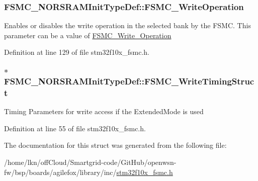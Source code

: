 \subsubsection[{\texorpdfstring{F\+S\+M\+C\+\_\+\+Write\+Operation}{FSMC_WriteOperation}}]{ F\+S\+M\+C\+\_\+\+N\+O\+R\+S\+R\+A\+M\+Init\+Type\+Def\+::\+F\+S\+M\+C\+\_\+\+Write\+Operation}\hypertarget{struct_f_s_m_c___n_o_r_s_r_a_m_init_type_def_a596793d1735c4e38c87e3bf91d986370}{}\label{struct_f_s_m_c___n_o_r_s_r_a_m_init_type_def_a596793d1735c4e38c87e3bf91d986370}
Enables or disables the write operation in the selected bank by the F\+S\+MC. This parameter can be a value of \hyperlink{group___f_s_m_c___write___operation}{F\+S\+M\+C\+\_\+\+Write\+\_\+\+Operation} 

Definition at line 129 of file stm32f10x\+\_\+fsmc.\+h.

\subsubsection[{\texorpdfstring{F\+S\+M\+C\+\_\+\+Write\+Timing\+Struct}{FSMC_WriteTimingStruct}}]{ $\ast$ F\+S\+M\+C\+\_\+\+N\+O\+R\+S\+R\+A\+M\+Init\+Type\+Def\+::\+F\+S\+M\+C\+\_\+\+Write\+Timing\+Struct}\hypertarget{struct_f_s_m_c___n_o_r_s_r_a_m_init_type_def_a4ca9ddc4f0dbad8192d672e78bf3be3d}{}\label{struct_f_s_m_c___n_o_r_s_r_a_m_init_type_def_a4ca9ddc4f0dbad8192d672e78bf3be3d}
Timing Parameters for write access if the Extended\+Mode is used 

Definition at line 55 of file stm32f10x\+\_\+fsmc.\+h.



The documentation for this struct was generated from the following file\+:\begin{DoxyCompactItemize}
\item 
/home/lkn/off\+Cloud/\+Smartgrid-\/code/\+Git\+Hub/openwsn-\/fw/bsp/boards/agilefox/library/inc/\hyperlink{agilefox_2library_2inc_2stm32f10x__fsmc_8h}{stm32f10x\+\_\+fsmc.\+h}\end{DoxyCompactItemize}

